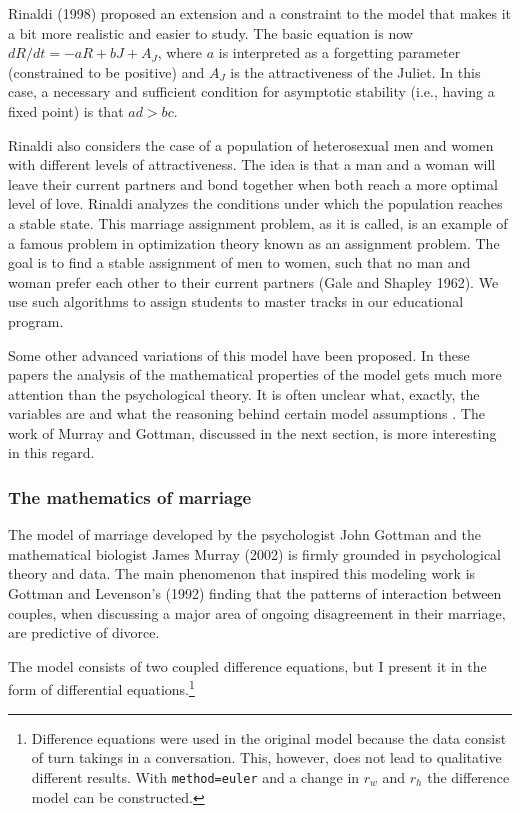 \documentclass[
  a4paper,
  DIV=11,
  numbers=noendperiod,
  oneside]{scrreprt}
\begin{document}
Rinaldi (1998) proposed an extension and a constraint to the model that
makes it a bit more realistic and easier to study. The basic equation is
now \(dR/dt = - aR + bJ + A_{J}\), where \(a\) is interpreted as a
forgetting parameter (constrained to be positive) and \(A_{J}\) is the
attractiveness of the Juliet. In this case, a necessary and sufficient
condition for asymptotic stability (i.e., having a fixed point) is that
\(ad > bc\).

Rinaldi also considers the case of a population of heterosexual men and
women with different levels of attractiveness. The idea is that a man
and a woman will leave their current partners and bond together when
both reach a more optimal level of love. Rinaldi analyzes the conditions
under which the population reaches a stable state. This marriage
assignment problem, as it is called, is an example of a famous problem
in optimization theory known as an assignment problem. The goal is to
find a stable assignment of men to women, such that no man and woman
prefer each other to their current partners (Gale and Shapley 1962). We
use such algorithms to assign students to master tracks in our
educational program.

Some other advanced variations of this model have been proposed. In
these papers the analysis of the mathematical properties of the model
gets much more attention than the psychological theory. It is often
unclear what, exactly, the variables are and what the reasoning behind
certain model assumptions . The work of Murray and Gottman, discussed in
the next section, is more interesting in this regard.

\subsubsection{The mathematics of
marriage}\label{sec-The-mathematics-of-marriage}

The model of marriage developed by the psychologist John Gottman and the
mathematical biologist James Murray (2002) is firmly grounded in
psychological theory and data. The main phenomenon that inspired this
modeling work is Gottman and Levenson's (1992) finding that the patterns
of interaction between couples, when discussing a major area of ongoing
disagreement in their marriage, are predictive of divorce.

The model consists of two coupled difference equations, but I present it
in the form of differential equations.\footnote{Difference equations
  were used in the original model because the data consist of turn
  takings in a conversation. This, however, does not lead to qualitative
  different results. With
  \texttt{method=\textquotesingle{}euler\textquotesingle{}} and a change
  in \(r_{w}\) and \(r_{h}\) the difference model can be constructed.}
\end{document}
